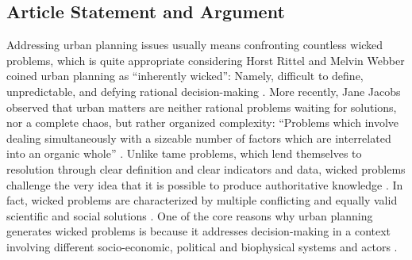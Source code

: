 \documentclass[10pt,a4paper]{article}
\begin{document}
\begin{multicols}{2}

\section{Article Statement and Argument}
\noindent Addressing urban planning issues usually means confronting countless wicked problems, which is quite appropriate considering Horst Rittel and Melvin Webber coined urban planning as ``inherently wicked'': Namely, difficult to define, unpredictable, and defying rational decision-making \citep{r01}. More recently, Jane Jacobs observed that urban matters are neither rational problems waiting for solutions, nor a complete chaos, but rather organized complexity: ``Problems which involve dealing simultaneously with a sizeable number of factors which are interrelated into an organic whole'' \citep{r02}. Unlike tame problems, which lend themselves to resolution through clear definition and clear indicators and data, wicked problems challenge the very idea that it is possible to produce authoritative knowledge \citep{r03, r04, r05}. In fact, wicked problems are characterized by multiple conflicting and equally valid scientific and social solutions \citep{r06, r07}. One of the core reasons why urban planning generates wicked problems is because it addresses decision-making in a context involving different socio-economic, political and biophysical systems and actors \citep{r08}.


\end{multicols}
\end{document}
